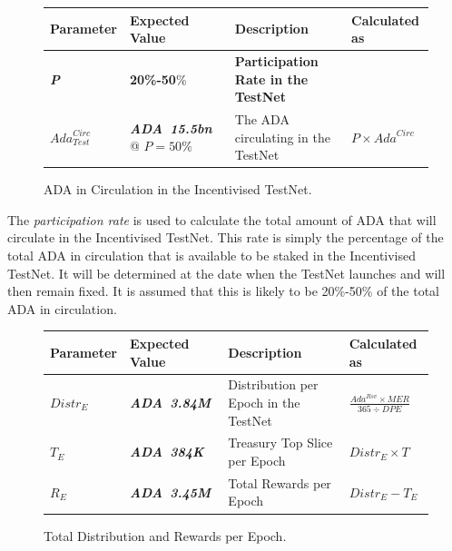 \documentclass[11pt,a4paper,dvipsnames,twosided,final]{article}
\newcommand{\khcomment}[1]{\todo[color=blue!20]{KH: #1}}
\newcommand{\ada}{ADA{}}
\newcommand{\ADA}[1]{\textbf{\emph{\ada~{#1}}}}
\begin{document}
\begin{figure}[h!]
\begin{center}
\begin{tabular}{||l|l|p{6cm}|l||}
  \hline \hline
\textbf{Parameter} & \textbf{Expected Value} & \textbf{Description} & \textbf{Calculated as} \\\hline
\textbf{\color{blue} \emph{P}} & \textbf{\color{blue} 20\%-50}\% & \textbf{\color{blue} Participation Rate in the TestNet} & \\\hline
$\textit{Ada}^{\textit{Circ}}_{\textit{Test}}$ & \ADA{15.5bn} @ $P=50\%$ & The \ada{} circulating in the TestNet & $P \times \textit{Ada}^{\textit{Circ}}$ \\\hline
  \hline
\end{tabular}
\end{center}
\caption{\ada{} in Circulation in the Incentivised TestNet.}
\end{figure}

\noindent
The \emph{participation rate} is used to calculate the total amount of \ada{} that will circulate in the Incentivised TestNet.
This rate is simply the percentage of the total \ada{} in  circulation that is available to be staked in the Incentivised TestNet.
It will be determined at the date when the
TestNet launches and will then remain fixed.
It is assumed that this is likely to be 20\%-50\% of the total \ada{} in circulation.


\begin{figure}[h!]
\begin{center}
\begin{tabular}{||l|l|p{6cm}|l||}
  \hline \hline
\textbf{Parameter} & \textbf{Expected Value} & \textbf{Description} & \textbf{Calculated as} \\\hline
$\textit{Distr}_E$ & \ADA{3.84M} & Distribution per Epoch in the TestNet & $\frac{\textit{Ada}^{\textit{Rsv}} \times \textit{MER}}{365 \div \textit{DPE}}$ \\\hline
$T_E$ & \ADA{384K} & Treasury Top Slice per Epoch & $\textit{Distr}_E \times T$ \\\hline
$R_E$ & \ADA{3.45M} & Total Rewards per Epoch & $\textit{Distr}_E - T_E$ \\\hline
  \hline
\end{tabular}
\end{center}
\caption{Total Distribution and Rewards per Epoch.}
\label{fig:distrib}
\end{figure}
\end{document}
